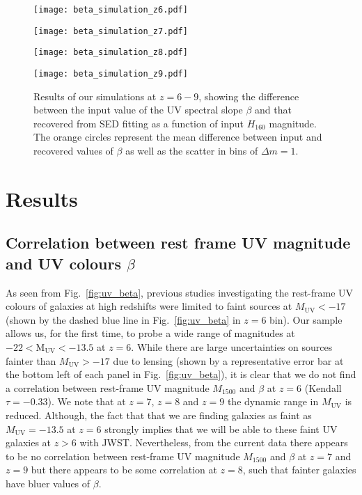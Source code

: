 \documentclass[twocolumn]{aastex63}
\begin{document}
\begin{figure*}
\centering
\begin{minipage}{0.45\textwidth}
\centering
\texttt{[image: beta\_simulation\_z6.pdf]}
\end{minipage}
\begin{minipage}{0.45\textwidth}
\centering
\texttt{[image: beta\_simulation\_z7.pdf]}
\end{minipage}
\begin{minipage}{0.45\textwidth}
\centering
\texttt{[image: beta\_simulation\_z8.pdf]}
\end{minipage}
\begin{minipage}{0.45\textwidth}
\centering
\texttt{[image: beta\_simulation\_z9.pdf]}
\end{minipage}
\caption{Results of our simulations at $z=6-9$, showing the difference between the input value of the UV spectral slope $\beta$ and that recovered from SED fitting as a function of input $H_{160}$ magnitude. The orange circles represent the mean difference between input and recovered values of $\beta$ as well as the scatter in bins of $\Delta m=1$. }
\label{fig:betasimulation}
\end{figure*}

\section{Results}\label{sec:results}
\subsection{Correlation between rest frame UV magnitude and UV colours $\beta$ }\label{sec:uvmag_betacorr}
As seen from Fig.~\ref{fig:uv_beta}, previous studies investigating the rest-frame UV colours of galaxies at high redshifts were limited to faint sources at $M_{\mathrm{UV}}<-17$ (shown by the dashed blue line in Fig.~\ref{fig:uv_beta} in $z=6$ bin). Our sample allows us, for the first time, to probe a wide range of magnitudes at $-22<\mathrm{M_{UV}<-13.5}$ at $z=6$. While there are large uncertainties on sources fainter than $M_{\mathrm{UV}}>-17$ due to lensing (shown by a representative error bar at the bottom left of each panel in Fig.~\ref{fig:uv_beta}), it is clear that we do not find a correlation between rest-frame UV magnitude $M_{1500}$ and $\beta$ at $z=6$ (Kendall $\tau=-0.33$). We note that at $z=7$, $z=8$ and $z=9$ the dynamic range in $M_{\mathrm{UV}}$ is reduced. Although, the fact that that we are finding galaxies as faint as $M_{\mathrm{UV}}=-13.5$ at $z=6$ strongly implies that we will be able to these faint UV galaxies at $z>6$ with JWST. Nevertheless, from the current data there appears to be no correlation between rest-frame UV magnitude $M_{1500}$ and $\beta$ at $z=7$ and $z=9$ but there appears to be some correlation at $z=8$, such that fainter galaxies have bluer values of $\beta$.
\end{document}
